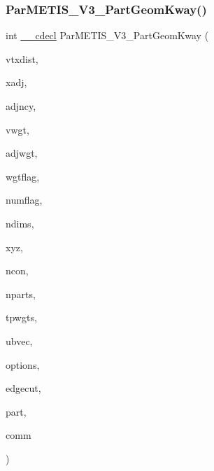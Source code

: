 \subsubsection{\texorpdfstring{Par\+M\+E\+T\+I\+S\+\_\+\+V3\+\_\+\+Part\+Geom\+Kway()}{ParMETIS\_V3\_PartGeomKway()}}
{\footnotesize\ttfamily int \hyperlink{a00843_a238347d7669f8f1e9c83bfe63a2730c4}{\+\_\+\+\_\+cdecl} Par\+M\+E\+T\+I\+S\+\_\+\+V3\+\_\+\+Part\+Geom\+Kway (\begin{DoxyParamCaption}\item[{\hyperlink{a00876_aaa5262be3e700770163401acb0150f52}{idx\+\_\+t} $\ast$}]{vtxdist,  }\item[{\hyperlink{a00876_aaa5262be3e700770163401acb0150f52}{idx\+\_\+t} $\ast$}]{xadj,  }\item[{\hyperlink{a00876_aaa5262be3e700770163401acb0150f52}{idx\+\_\+t} $\ast$}]{adjncy,  }\item[{\hyperlink{a00876_aaa5262be3e700770163401acb0150f52}{idx\+\_\+t} $\ast$}]{vwgt,  }\item[{\hyperlink{a00876_aaa5262be3e700770163401acb0150f52}{idx\+\_\+t} $\ast$}]{adjwgt,  }\item[{\hyperlink{a00876_aaa5262be3e700770163401acb0150f52}{idx\+\_\+t} $\ast$}]{wgtflag,  }\item[{\hyperlink{a00876_aaa5262be3e700770163401acb0150f52}{idx\+\_\+t} $\ast$}]{numflag,  }\item[{\hyperlink{a00876_aaa5262be3e700770163401acb0150f52}{idx\+\_\+t} $\ast$}]{ndims,  }\item[{\hyperlink{a00876_a1924a4f6907cc3833213aba1f07fcbe9}{real\+\_\+t} $\ast$}]{xyz,  }\item[{\hyperlink{a00876_aaa5262be3e700770163401acb0150f52}{idx\+\_\+t} $\ast$}]{ncon,  }\item[{\hyperlink{a00876_aaa5262be3e700770163401acb0150f52}{idx\+\_\+t} $\ast$}]{nparts,  }\item[{\hyperlink{a00876_a1924a4f6907cc3833213aba1f07fcbe9}{real\+\_\+t} $\ast$}]{tpwgts,  }\item[{\hyperlink{a00876_a1924a4f6907cc3833213aba1f07fcbe9}{real\+\_\+t} $\ast$}]{ubvec,  }\item[{\hyperlink{a00876_aaa5262be3e700770163401acb0150f52}{idx\+\_\+t} $\ast$}]{options,  }\item[{\hyperlink{a00876_aaa5262be3e700770163401acb0150f52}{idx\+\_\+t} $\ast$}]{edgecut,  }\item[{\hyperlink{a00876_aaa5262be3e700770163401acb0150f52}{idx\+\_\+t} $\ast$}]{part,  }\item[{M\+P\+I\+\_\+\+Comm $\ast$}]{comm }\end{DoxyParamCaption})}

